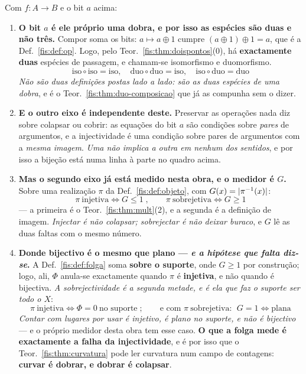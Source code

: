 \documentclass[livro.tex]{subfiles}
\begin{document}
\begin{teorema}\label{fis:thm:eixos}
Com $f\colon A\to B$ e o bit $a$ acima:
\begin{enumerate}\itemsep3pt
\item[(1)] \textbf{O bit $a$ é ele próprio uma dobra, e por isso as espécies são
duas e não três.} Compor soma os bits: $a\mapsto a\oplus1$ cumpre
$(a\oplus1)\oplus1=a$, que é a Def.~\ref{fis:def:op}. Logo, pelo
Teor.~\ref{fis:thm:doispontos}(0), há \textbf{exactamente duas} espécies de
passagem, e chamam-se isomorfismo e duomorfismo.
\[
\boxed{\;\text{iso}\circ\text{iso}=\text{iso},\quad
\text{duo}\circ\text{duo}=\text{iso},\quad
\text{iso}\circ\text{duo}=\text{duo}\;}
\]
\emph{Não são duas definições postas lado a lado: são as duas espécies de uma
dobra}, e é o Teor.~\ref{fis:thm:duo-composicao} que já as compunha sem o dizer.
\item[(2)] \textbf{E o outro eixo é independente deste.} Preservar as operações
nada diz sobre colapsar ou cobrir: as equações do bit $a$ são condições sobre
\emph{pares} de argumentos, e a injectividade é uma condição sobre pares de
argumentos com a \emph{mesma imagem}. \emph{Uma não implica a outra em nenhum dos
sentidos}, e por isso a bijeção está numa linha à parte no quadro acima.
\item[(3)] \textbf{Mas o segundo eixo já está medido nesta obra, e o medidor é
$G$.} Sobre uma realização $\pi$ da Def.~\ref{fis:def:objeto}, com
$G(x)=\lvert \pi^{-1}(x)\rvert$:
\[
\boxed{\;\pi\ \text{injetiva}\iff G\le1\;,\qquad
\pi\ \text{sobrejetiva}\iff G\ge1\;}
\]
--- a primeira é o Teor.~\ref{fis:thm:mult}(2), e a segunda é a definição de
imagem. \emph{Injectar é não colapsar; sobrejectar é não deixar buraco}, e $G$ lê
as duas faltas com o mesmo número.
\item[(4)] \textbf{Donde bijectivo é o mesmo que plano --- \emph{e a hipótese que
falta diz-se}.} A Def.~\ref{fis:def:folga} soma \textbf{sobre o suporte}, onde
$G\ge1$ por construção; logo, ali, $\Phi$ anula-se exactamente quando $\pi$ é
\textbf{injetiva}, e não quando é bijectiva. \emph{A sobrejectividade é a segunda
metade, e é ela que faz o suporte ser todo o $X$}:
\[
\boxed{\;\pi\ \text{injetiva}\iff\Phi=0\ \text{no suporte}\;;\qquad
\text{e com }\pi\ \text{sobrejetiva}:\ \ G=1\iff\text{plana}\;}
\]
\emph{Contar com lugares por usar é injetivo, é plano no suporte, e não é
bijectivo} --- e o próprio medidor desta obra tem esse caso. \textbf{O que a folga
mede é exactamente a falha da injectividade}, e é por isso
que o Teor.~\ref{fis:thm:curvatura} pode ler curvatura num campo de contagens:
\textbf{curvar é dobrar, e dobrar é colapsar}.
\end{enumerate}
\end{teorema}
\end{document}
